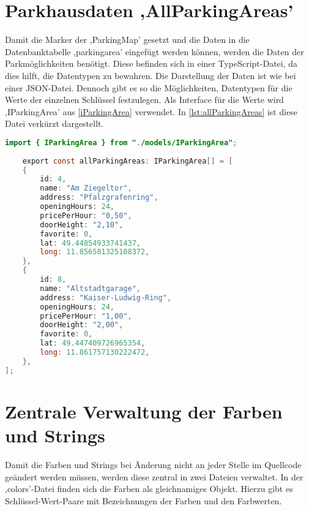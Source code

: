 \section{Parkhausdaten ,AllParkingAreas'}
\label{AllParkingAreas}
Damit die Marker der ,ParkingMap' gesetzt und die Daten in die Datenbanktabelle ,parkingarea' eingefügt werden können, werden die Daten der Parkmöglichkeiten benötigt. Diese befinden sich in einer TypeScript-Datei, da dies hilft, die Datentypen zu bewahren. Die Darstellung der Daten ist wie bei einer JSON-Datei. Dennoch gibt es so die Möglichkeiten, Datentypen für die Werte der einzelnen Schlüssel festzulegen. Als Interface für die Werte wird ,IParkingArea' aus \autoref{iParkingArea} verwendet. In \autoref{lst:allParkingAreas} ist diese Datei verkürzt dargestellt. 

\begin{lstlisting}[caption={Die verkürzte Darstellung der Datei, welche die Daten der Parkmöglichkeiten beinhaltet. Wäre Typensicherheit egal, könnten die Daten auch in eine JSON-Datei geschrieben werden. (Quelle: Eigene Implementierung)},captionpos=b, language=Java, label=lst:allParkingAreas]
	import { IParkingArea } from "./models/IParkingArea";
	
	export const allParkingAreas: IParkingArea[] = [
	{
		id: 4,
		name: "Am Ziegeltor",
		address: "Pfalzgrafenring",
		openingHours: 24,
		pricePerHour: "0,50",
		doorHeight: "2,10",
		favorite: 0,
		lat: 49.44854933741437,
		long: 11.856581325108372,
	},
	{
		id: 8,
		name: "Altstadtgarage",
		address: "Kaiser-Ludwig-Ring",
		openingHours: 24,
		pricePerHour: "1,00",
		doorHeight: "2,00",
		favorite: 0,
		lat: 49.447409726965354,
		long: 11.861757130222472,
	},
];	
\end{lstlisting}

\section{Zentrale Verwaltung der Farben und Strings}
Damit die Farben und Strings bei Änderung nicht an jeder Stelle im Quellcode geändert werden müssen, werden diese zentral in zwei Dateien verwaltet. In der ,colors'-Datei finden sich die Farben als gleichnamiges Objekt. Hierzu gibt es Schlüssel-Wert-Paare mit Bezeichnungen der Farben und den Farbwerten. 

